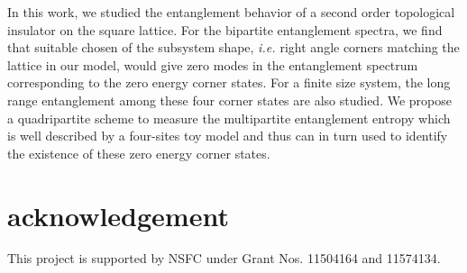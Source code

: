 \documentclass[twocolumn,superscriptaddress]{revtex4-1}
\newcommand{\ie}{\textit{i.e.{ }}}
\begin{document}
In this work, we studied the entanglement behavior of a second order topological insulator on the square lattice. For the bipartite entanglement spectra, we find that suitable chosen of the subsystem shape, \ie right angle corners matching the lattice in our model, would give zero modes in the entanglement spectrum corresponding to the zero energy corner states. For a finite size system, the long range entanglement among these four corner states are also studied. We propose a quadripartite scheme to measure the multipartite entanglement entropy which is well described by a four-sites toy model and thus can in turn used to identify the existence of these zero energy corner states. 

\section{acknowledgement}
This project is supported by NSFC under Grant Nos. 11504164 and 11574134.


\end{document}
